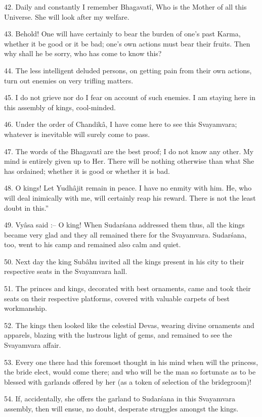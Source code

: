42. Daily and constantly I remember Bhagavat\^i, Who is the Mother of all this Universe. She will look after my welfare.

43. Behold! One will have certainly to bear the burden of one's past Karma, whether it be good or it be bad; one's own actions must bear their fruits. Then why shall he be sorry, who has come to know this?

44. The less intelligent deluded persons, on getting pain from their own actions, turn out enemies on very trifling matters.

45. I do not grieve nor do I fear on account of such enemies. I am staying here in this assembly of kings, cool-minded.

46. Under the order of Chandik\^a, I have come here to see this Svayamvara; whatever is inevitable will surely come to pass.

47. The words of the Bhagavat\^i are the best proof; I do not know any other. My mind is entirely given up to Her. There will be nothing otherwise than what She has ordained; whether it is good or whether it is bad.

48. O kings! Let Yudh\^ajit remain in peace. I have no enmity with him. He, who will deal inimically with me, will certainly reap his reward. There is not the least doubt in this.''

49. Vy\^asa said :-- O king! When Sudar\'sana addressed them thus, all the kings became very glad and they all remained there for the Svayamvara. Sudar\'sana, too, went to his camp and remained also calm and quiet.

50. Next day the king Sub\^ahu invited all the kings present in his city to their respective seats in the Svayamvara hall.

51. The princes and kings, decorated with best ornaments, came and took their seats on their respective platforms, covered with valuable carpets of best workmanship.

52. The kings then looked like the celestial Devas, wearing divine ornaments and apparels, blazing with the lustrous light of gems, and remained to see the Svayamvara affair.

53. Every one there had this foremost thought in his mind when will the princess, the bride elect, would come there; and who will be the man so fortunate as to be blessed with garlands offered by her (as a token of selection of the bridegroom)!

54. If, accidentally, she offers the garland to Sudar\'sana in this Svayamvara assembly, then will ensue, no doubt, desperate struggles amongst the kings.

